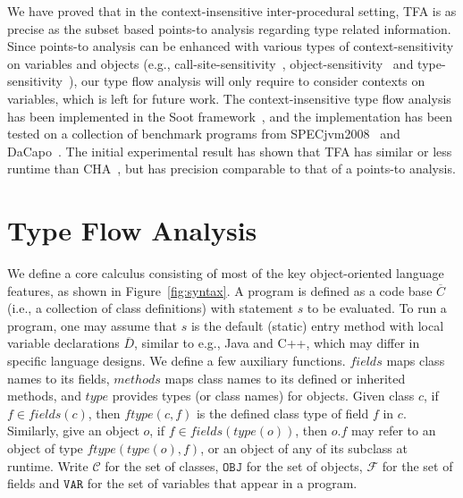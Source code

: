 \documentclass{llncs}
\newcommand{\keyword}[1]{\mathsf{#1}}
\newcommand{\kwnull}[0]{\keyword{null}}
\newcommand\Var{\mathtt{VAR}}
\newcommand\Val{\mathtt{V}}
\newcommand\Obj{\mathtt{OBJ}}
\newcommand{\Class}{\mathcal{C}}
\newcommand{\Field}{\mathcal{F}}
\newcommand\set[1]{\{#1\}}
\begin{document}
We have proved that in the context-insensitive inter-procedural setting, TFA is as precise as the subset based points-to analysis regarding type related information. Since points-to analysis can be enhanced with various types of context-sensitivity on variables and objects (e.g., call-site-sensitivity~\cite{Shivers91,Kastrinis2013}, object-sensitivity~\cite{Milanova2005,Smaragdakis11,Tan16} and type-sensitivity~\cite{Smaragdakis11}), our type flow analysis will only require to consider contexts on variables, which is left for future work. The context-insensitive type flow analysis has been implemented in the Soot framework~\cite{soot}, and the implementation has been tested on a collection of benchmark programs from SPECjvm2008~\cite{specjvm} and DaCapo~\cite{Blackburn2006}. %
The initial experimental result has shown that TFA has similar or less runtime than CHA~\cite{Dean1995}, but has precision comparable to that of a points-to analysis.

\section{Type Flow Analysis}\label{sec:type-flow-analysis}

We define a core calculus consisting of most of the key object-oriented language features, as shown in Figure~\ref{fig:syntax}.
A program is defined as a code base $\overline{C}$ (i.e., a collection of class definitions) with statement $s$ to be evaluated.
To run a program, one may assume that $s$ is the default (static) entry method with local variable declarations $\overline{D}$,
similar to e.g., Java and C++,
which may differ in specific language designs.
We define a few auxiliary functions. $fields$ maps class names to its fields, $methods$ maps class names to its defined or inherited methods, and $type$ provides types (or class names) for objects. Given class $c$, if $f\in fields(c)$, then $ftype(c,f)$ is the defined class type of field $f$ in $c$. Similarly, give an object $o$, if $f\in fields(type(o))$, then $o.f$ may refer to an object of type $ftype(type(o),f)$,
or an object of any of its subclass at runtime. Write $\Class$ for the set of classes, $\Obj$ for the set of objects, $\Field$ for the set of fields and $\Var$ for the set of variables that appear in a program.
\end{document}
